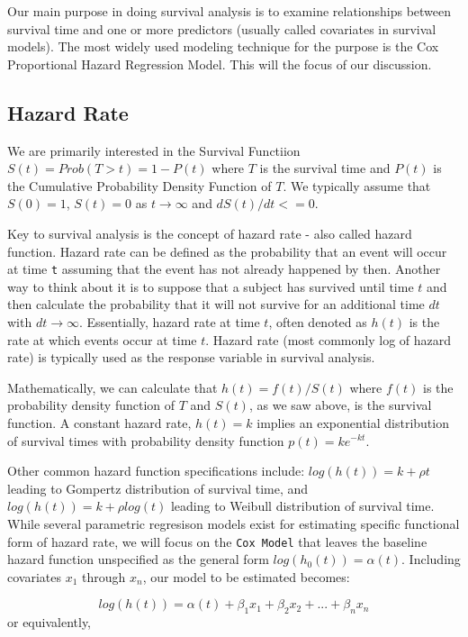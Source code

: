 \documentclass[10pt, letterpaper, twoside]{memoir}\usepackage{knitr}
\begin{document}
Our main purpose in doing survival analysis is to examine relationships between survival time and one or more predictors (usually called covariates in survival models). The most widely used modeling technique for the purpose is the Cox Proportional Hazard Regression Model. This will the focus of our discussion. 

\subsection{Hazard Rate}

We are primarily interested in the Survival Functiion $S(t) = Prob(T > t) = 1 - P(t)$ where $T$ is the survival time and $P(t)$ is the Cumulative Probability Density Function of $T$. We typically assume that $S(0) = 1$, $S(t) = 0$ as $t \rightarrow \infty $ and ${d S(t)}/{dt} <= 0$. 

Key to survival analysis is the concept of hazard rate - also called hazard function. Hazard rate can be defined as the probability that an event will occur at time \texttt{t} assuming that the event has not already happened by then. Another way to think about it is to suppose that a subject has survived until time $t$ and then calculate the probability that it will not survive for an additional time $dt$ with $dt \rightarrow \infty$. Essentially, hazard rate at time $t$, often denoted as $h(t)$ is the rate at which events occur at time $t$. Hazard rate (most commonly log of hazard rate) is typically used as the response variable in survival analysis. 

Mathematically, we can calculate that $h(t) = f(t) / S(t)$ where $f(t)$ is the probability density function of $T$ and $S(t)$, as we saw above, is the survival function. A constant hazard rate, $h(t) = k$ implies an exponential distribution of survival times with probability density function $p(t) = k e^{-kt}$. 

Other common hazard function specifications include: $log(h(t)) = k + \rho t $ leading to Gompertz distribution of survival time, and $log(h(t)) = k + \rho log(t)$ leading to Weibull distribution of survival time. While several parametric regresison models exist for estimating specific functional form of hazard rate, we will focus on the \texttt{Cox Model} that leaves the baseline hazard function unspecified as the general form $log(h_0(t)) = \alpha(t)$. Including covariates $x_1$ through $x_n$, our model to be estimated becomes:

$$log(h(t)) = \alpha(t) + \beta_1 x_1 + \beta_2 x_2 + ... + \beta_n x_n$$ or equivalently,
\end{document}
